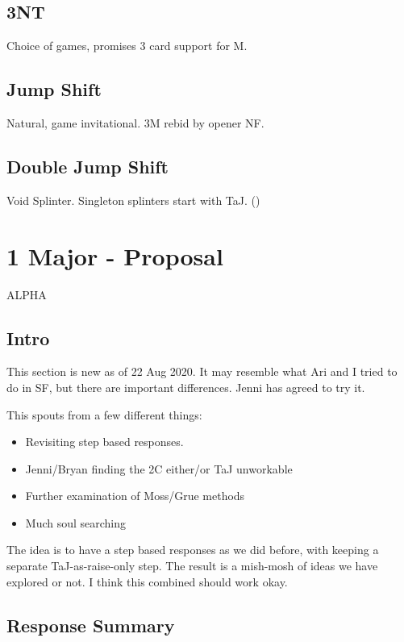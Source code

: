 \documentclass[tom-ari]{subfile}
\begin{document}
	\section{3NT}
	
	Choice of games, promises 3 card support for M.
	
	\section{Jump Shift}
	
	Natural, game invitational. 3M rebid by opener NF.
	
	\section{Double Jump Shift}
	
	Void Splinter. Singleton splinters start with TaJ. ()
	
	\chapter{1 Major - Proposal}

	\Huge{\color{red}ALPHA} \normalsize
	
	\section{Intro}
	
	This section is new as of 22 Aug 2020.  It may resemble what Ari and I tried to do in SF, but there are important differences.  Jenni has agreed to try it.
	
	This spouts from a few different things:
	
	\begin{itemize}
		\item Revisiting step based responses.
		\item Jenni/Bryan finding the 2C either/or TaJ unworkable
		\item Further examination of Moss/Grue methods
		\item Much soul searching
	\end{itemize}
		
	The idea is to have a step based responses as we did before, with keeping a separate TaJ-as-raise-only step.  The result is a mish-mosh of ideas we have explored or not.  I think this combined should work okay.
	
	\section{Response Summary}
	
\end{document}
